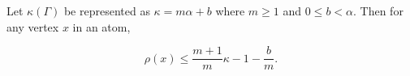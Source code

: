 Let $\kappa(\Gamma)$ be represented as $\kappa = m\alpha + b$ where $m \geq 1$ and $0 \leq b < \alpha$. Then for any vertex $x$ in an atom,

$$\rho(x) \leq \frac{m + 1}{m} \kappa - 1 - \frac{b}{m}.$$
